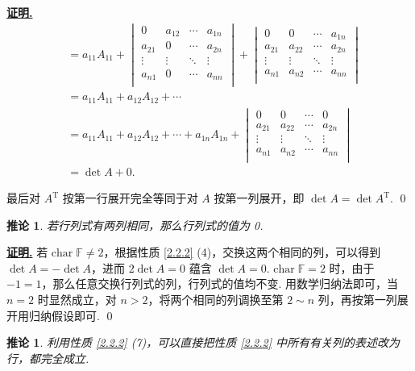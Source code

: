 \documentclass[10pt,openany]{article}
\theoremstyle{thmstyle} %
\theoremstyle{defstyle} %
\newtheorem{corollary}[theorem]{推论}
\theoremstyle{prostyle} %
\theoremstyle{exastyle}
\theoremstyle{remstyle}
\renewenvironment{proof}[1][证明]{\par\underline{\textbf{#1.}} \;\fangsong}{\qed\par}
\newcommand{\T}{^{\text{T}}}
\newcommand{\F}{\mathbb{F}}
\newcommand{\tz}{\mathrm{char} \;}
\begin{document}
\begin{proof}
\begin{align*}
     	&= a_{11}A_{11}+ \begin{vmatrix}
     	0 & a_{12} & \cdots & a_{1n} \\
     	a_{21} & 0 & \cdots & a_{2n} \\
     	\vdots & \vdots & \ddots & \vdots \\
     	a_{n1} & 0 & \cdots & a_{nn} \\
     	\end{vmatrix}+\begin{vmatrix}
     	0 & 0 & \cdots & a_{1n} \\
     	a_{21} & a_{22} & \cdots & a_{2n} \\
     	\vdots & \vdots & \ddots & \vdots \\
     	a_{n1} & a_{n2} & \cdots & a_{nn} \\
     	\end{vmatrix} \\
     	&= a_{11}A_{11}+a_{12}A_{12}+\cdots \\
     	&=  a_{11}A_{11}+a_{12}A_{12}+\cdots+a_{1n}A_{1n}+ \begin{vmatrix}
     		0 & 0 & \cdots & 0 \\
     		a_{21} & a_{22} & \cdots & a_{2n} \\
     		\vdots & \vdots & \ddots & \vdots \\
     		a_{n1} & a_{n2} & \cdots & a_{nn} \\
     	\end{vmatrix} \\
     	&= \det A+0.
     \end{align*}
     
     最后对 \( A\T \) 按第一行展开完全等同于对 \( A \) 按第一列展开，即 \( \det A=\det A\T \).
\end{proof}


\begin{corollary}
	若行列式有两列相同，那么行列式的值为 0.
	\label{2.2.3}
\end{corollary}

\begin{proof}
	若 \( \tz \F \neq 2 \)，根据性质 \ref{2.2.2} (4)，交换这两个相同的列，可以得到 \( \det A=-\det A \)，进而 \( 2\det A=0 \) 蕴含 \( \det A=0 \).  \( \tz \F=2 \) 时，由于 \( -1=1 \)，那么任意交换行列式的列，行列式的值均不变. 用数学归纳法即可，当 \( n=2 \) 时显然成立，对 \( n>2 \)，将两个相同的列调换至第 \( 2 \sim n \) 列，再按第一列展开用归纳假设即可.
\end{proof}

\begin{corollary}
	利用性质 \ref{2.2.2} (7)，可以直接把性质 \ref{2.2.2} 中所有有关列的表述改为行，都完全成立.
	\label{2.2.4}
\end{corollary}
\end{document}
